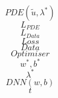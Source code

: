\documentclass[11pt]{memoir}
\begin{document}
	$$PDE\left(\tilde{u}, \lambda^*\right) $$
	\[ L_{PDE} \]
	\[ L_{Data} \]
	\[ Loss \]
	\[ Data \]
	\[ Optimiser \]
	\[ w^*, b^* \]
	\[ \lambda^* \]
	\[ DNN(w,b) \]
	\[ t \]
\end{document}
